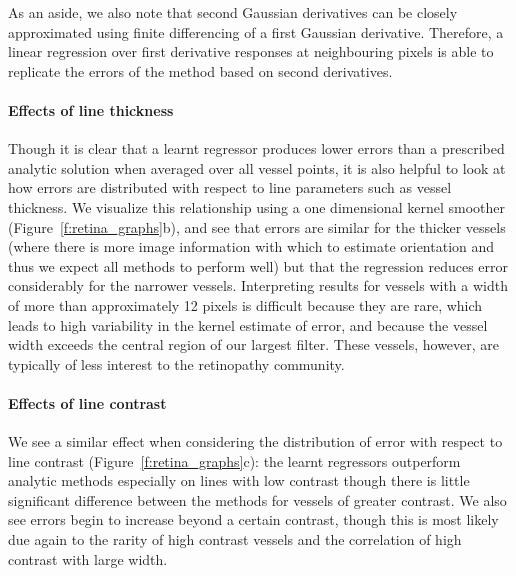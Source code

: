 \documentclass[10pt,twocolumn,letterpaper]{article}
\newcommand{\fref}[1]{Figure~\ref{#1}}
\begin{document}
As an aside, we also note that second Gaussian derivatives can be closely approximated using finite differencing of a first Gaussian derivative. Therefore, a linear regression over first derivative responses at neighbouring pixels is able to replicate the errors of the method based on second derivatives.

\paragraph{Effects of line thickness}
Though it is clear that a learnt regressor produces lower errors than a prescribed analytic solution when averaged over all vessel points, it is also helpful to look at how errors are distributed with respect to line parameters such as vessel thickness. We visualize this relationship using a one dimensional kernel smoother (\fref{f:retina_graphs}b), and see that errors are similar for the thicker vessels (where there is more image information with which to estimate orientation and thus we expect all methods to perform well) but that the regression reduces error considerably for the narrower vessels. Interpreting results for vessels with a width of more than approximately 12 pixels is difficult because they are rare, which leads to high variability in the kernel estimate of error, and because the vessel width exceeds the central region of our largest filter. These vessels, however, are typically of less interest to the retinopathy community.

\paragraph{Effects of line contrast}
We see a similar effect when considering the distribution of error with respect to line contrast (\fref{f:retina_graphs}c): the learnt regressors outperform analytic methods especially on lines with low contrast though there is little significant difference between the methods for vessels of greater contrast. We also see errors begin to increase beyond a certain contrast, though this is most likely due again to the rarity of high contrast vessels and the correlation of high contrast with large width.
\end{document}
